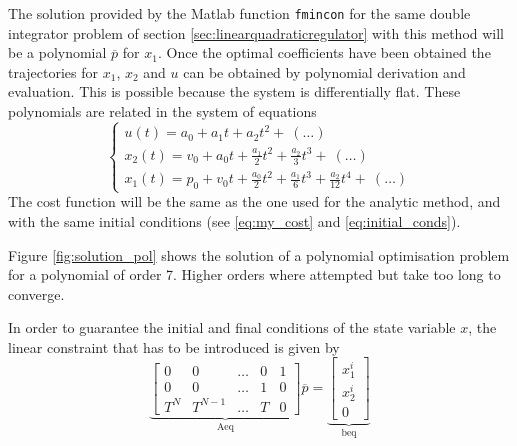 \par The solution provided by the Matlab function \texttt{fmincon} for the same double integrator problem of section \ref{sec:linearquadraticregulator} with this method will be a polynomial $\overline{p}$ for $x_1$. Once the optimal coefficients have been obtained the trajectories for $x_1$, $x_2$ and $u$ can be obtained by polynomial derivation and evaluation. This is possible because the system is differentially flat. These polynomials are related in the system of equations
\begin{equation}
    \label{eq:polys_of_double_integrator}
    \begin{cases}
        u (t) = a_0 + a_1 t + a_2 t^2 + \ (\dots) \\
        x_2 (t) = v_0 + a_0 t + \frac{a_1}{2} t^2 + \frac{a_2}{3} t^3 + \ (\dots)  \\
        x_1 (t) = p_0 + v_0 t + \frac{a_0}{2} t^2 + \frac{a_1}{6} t^3 + \frac{a_2}{12} t^4 + \ (\dots)
    \end{cases}
\end{equation}
 The cost function will be the same as the one used for the analytic method, and with the same initial conditions (see \ref{eq:my_cost} and \ref{eq:initial_conds}).
\par Figure \ref{fig:solution_pol} shows the solution of a polynomial optimisation problem for a polynomial of order 7. Higher orders where attempted but take too long to converge. %


\par In order to guarantee the initial and final conditions of the state variable $x$, the linear constraint that has to be introduced is given by
\begin{equation}
    \label{eq:pol_equality}
    \underbrace{\begin{bmatrix}
    0 & 0 & \dots & 0 & 1 \\
    0 & 0 & \dots & 1 & 0 \\
    T^N & T^{N-1} & \dots & T & 0 
    \end{bmatrix}}_\text{Aeq} \overline{p}  =
    \underbrace{\begin{bmatrix} x_1^i \\ x_2^i        \\ 0 \end{bmatrix}}_\text{beq}
\end{equation}


